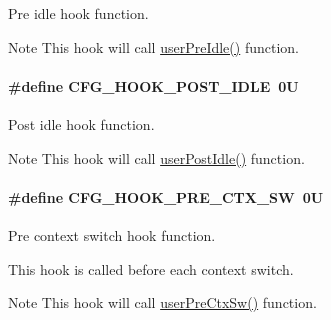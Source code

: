 Pre idle hook function. 

\begin{DoxyNote}{Note}
This hook will call \hyperlink{group__kern__intf_ga2bd40d82f768787c3dab2f4df336685e}{user\-Pre\-Idle()} function. 
\end{DoxyNote}
\hypertarget{group__template__kern__cfg_ga8f8751efe94964bef25673deca6b9b26}{
\paragraph[{C\-F\-G\-\_\-\-H\-O\-O\-K\-\_\-\-P\-O\-S\-T\-\_\-\-I\-D\-L\-E}]{\setlength{\rightskip}{0pt plus 5cm}\#define C\-F\-G\-\_\-\-H\-O\-O\-K\-\_\-\-P\-O\-S\-T\-\_\-\-I\-D\-L\-E~0\-U}}\label{group__template__kern__cfg_ga8f8751efe94964bef25673deca6b9b26}


Post idle hook function. 

\begin{DoxyNote}{Note}
This hook will call \hyperlink{group__kern__intf_ga7ca4a96cbe5064d633298d1d172fd4e7}{user\-Post\-Idle()} function. 
\end{DoxyNote}
\hypertarget{group__template__kern__cfg_gac84acbf84222018398089920dd429635}{
\paragraph[{C\-F\-G\-\_\-\-H\-O\-O\-K\-\_\-\-P\-R\-E\-\_\-\-C\-T\-X\-\_\-\-S\-W}]{\setlength{\rightskip}{0pt plus 5cm}\#define C\-F\-G\-\_\-\-H\-O\-O\-K\-\_\-\-P\-R\-E\-\_\-\-C\-T\-X\-\_\-\-S\-W~0\-U}}\label{group__template__kern__cfg_gac84acbf84222018398089920dd429635}


Pre context switch hook function. 

This hook is called before each context switch. \begin{DoxyNote}{Note}
This hook will call \hyperlink{group__kern__intf_ga74a38c965110d0f2f2e44e13571fe3fc}{user\-Pre\-Ctx\-Sw()} function. 
\end{DoxyNote}
